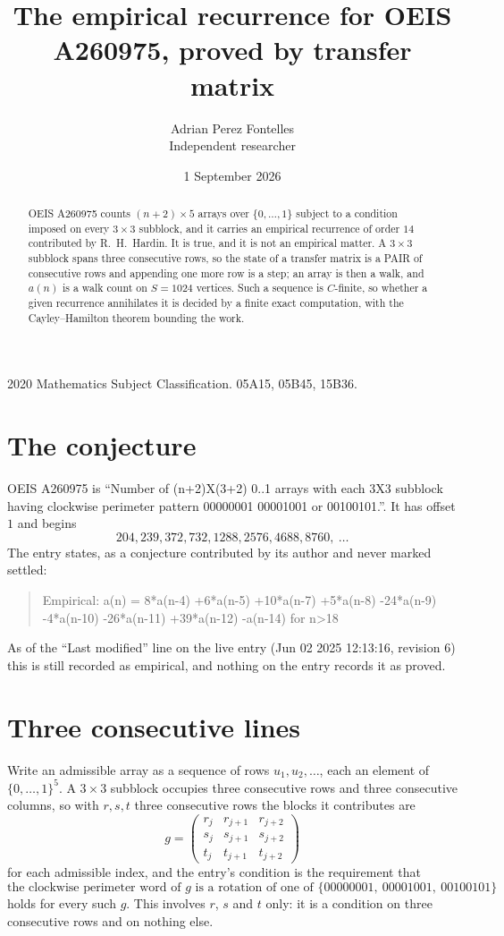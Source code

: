 \documentclass[11pt,a4paper]{article}
\title{The empirical recurrence for OEIS A260975, proved by transfer matrix}
\author{Adrian Perez Fontelles\\ \small Independent researcher}
\date{1 September 2026}
\theoremstyle{plain}
\theoremstyle{definition}
\begin{document}
\maketitle

\begin{abstract}
OEIS A260975 counts $(n+2)\times5$ arrays over $\{0,\dots,1\}$ subject to a condition imposed on
every $3\times3$ subblock, and it carries an empirical recurrence of order $14$
contributed by R.~H.~Hardin. It is true, and it is not an empirical matter. A $3\times3$
subblock spans three consecutive rows, so the state of a transfer matrix is a PAIR of
consecutive rows and appending one more row is a step; an array is then a walk, and
$a(n)$ is a walk count on $S=1024$ vertices. Such a sequence is $C$-finite, so whether a given
recurrence annihilates it is decided by a finite exact computation, with the Cayley--Hamilton
theorem bounding the work.
\end{abstract}

\noindent\small 2020 Mathematics Subject Classification. 05A15, 05B45, 15B36.\normalsize

\section{The conjecture}

OEIS A260975 is ``Number of (n+2)X(3+2) 0..1 arrays with each 3X3 subblock having clockwise perimeter pattern 00000001 00001001 or 00100101.''. It has offset $1$ and begins
\[
204, 239, 372, 732, 1288, 2576, 4688, 8760,\ \dots
\]
The entry states, as a conjecture contributed by its author and never marked settled:
\begin{quote}
Empirical: a(n) = 8*a(n-4) +6*a(n-5) +10*a(n-7) +5*a(n-8) -24*a(n-9) -4*a(n-10) -26*a(n-11) +39*a(n-12) -a(n-14) for n>18
\end{quote}
As of the ``Last modified'' line on the live entry (Jun 02 2025 12:13:16, revision 6) this is still
recorded as empirical, and nothing on the entry records it as proved.

\section{Three consecutive lines}

Write an admissible array as a sequence of rows $u_1,u_2,\dots$, each an element of
$\{0,\dots,1\}^{5}$. A $3\times3$ subblock occupies three consecutive rows and
three consecutive columns, so with $r,s,t$ three consecutive rows the blocks it
contributes are
\[
g=\begin{pmatrix}r_j&r_{j+1}&r_{j+2}\\ s_j&s_{j+1}&s_{j+2}\\ t_j&t_{j+1}&t_{j+2}\end{pmatrix}
\]
for each admissible index, and the entry's condition is the requirement that
\[
\text{the clockwise perimeter word of }g\text{ is a rotation of one of }\{00000001,\ 00001001,\ 00100101\}
\]
holds for every such $g$. This involves $r$, $s$ and $t$ only: it is a condition on
three consecutive rows and on nothing else.
\end{document}
